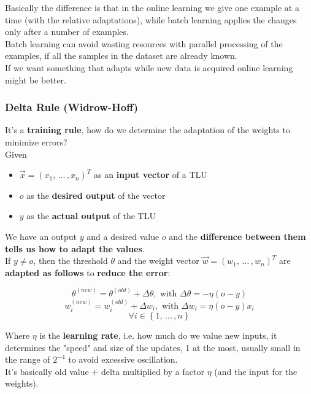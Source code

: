 Basically the difference is that in the online learning we give one example at a time (with the relative adaptations), while batch learning applies the changes only after a number of examples.\\

Batch learning can avoid wasting resources with parallel processing of the examples, if all the samples in the dataset are already known. \\

If we want something that adapts while new data is acquired online learning might be better.\\

\newpage

\subsubsection{Delta Rule (Widrow-Hoff)}
It's a \textbf{training rule}, how do we determine the adaptation of the weights to minimize errors?\\

Given
\begin{itemize}
	\item $\vec{x} = \left(x_1, \, ... \, , x_n \right)^T$ as an \textbf{input vector} of a TLU
	\item $o$ as the \textbf{desired output} of the vector
	\item $y$ as the \textbf{actual output} of the TLU
\end{itemize}

We have an output $y$ and a desired value $o$ and the \textbf{difference between them tells us how to adapt the values}.\\

If $y \neq o$, then the threshold $\theta$ and the weight vector $\vec{w} = \left(w_1, \, ... \, , w_n\right)^T$ are \textbf{adapted as follows} to \textbf{reduce the error}: 

$$ \theta^{(new)} = \theta^{(old)} + \Delta \theta, \text{ with } \Delta \theta = - \eta (o - y) $$
$$ w_i^{(new)} = w_i^{(old)} + \Delta w_i, \text{ with } \Delta w_i = \eta (o - y) x_i $$ 
$$\forall i \in \left\{1, \, ... \, , n\right\}$$

Where $\eta$ is the \textbf{learning rate}, i.e. how much do we value new inputs, it determines the "speed" and size of the updates, 1 at the most, usually small in the range of $2^{-4}$ to avoid excessive oscillation. \\

It's basically old value $+$ delta multiplied by a factor $\eta$ (and the input for the weights).\\

